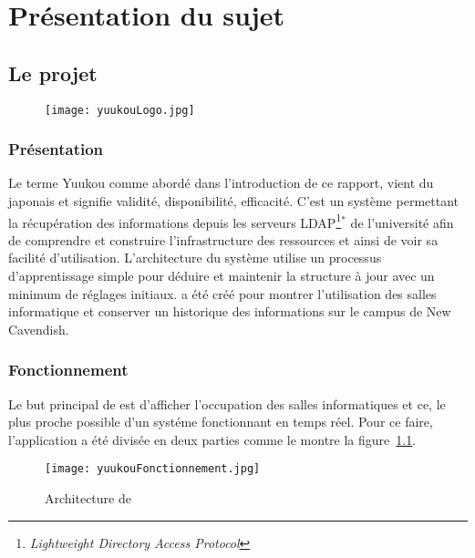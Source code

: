 \chapter{Pr\'esentation du sujet}

\section{Le projet \Yuukou}

\begin{figure}[!ht]
	\centering
	\texttt{[image: yuukouLogo.jpg]}

\end{figure}

\subsection{Pr\'esentation}

Le terme Yuukou comme abord\'e dans l'introduction de ce rapport, vient du japonais \Yuukou{} et signifie validit\'e, disponibilit\'e, efficacit\'e.
C'est un syst\`eme permettant la r\'ecup\'eration des informations depuis les serveurs LDAP\protect\footnote{\textit{Lightweight Directory Access Protocol}}$^*$ de l'universit\'e afin de comprendre et construire l'infrastructure des ressources et ainsi de voir sa facilit\'e d'utilisation. 
L'architecture du syst\`eme utilise un processus d'apprentissage simple pour d\'eduire et maintenir la structure \`a jour avec un minimum de r\'eglages initiaux.
\Yuukou{} a \'et\'e cr\'e\'e pour montrer l'utilisation des salles informatique et conserver un historique des informations sur le campus de New Cavendish.

\subsection{Fonctionnement}

Le but principal de \Yuukou{} est d'afficher l'occupation des salles informatiques et ce, le plus proche possible d'un syst\'eme fonctionnant en temps r\'eel.
Pour ce faire, l'application a \'et\'e divis\'ee en deux parties  comme le montre la figure~\ref{figure:yuukouFonctionnement}.

\clearpage

\begin{figure}[!ht]
	\centering
	\texttt{[image: yuukouFonctionnement.jpg]}
	\caption{Architecture de \Yuukou}
	\label{figure:yuukouFonctionnement}

\end{figure}

